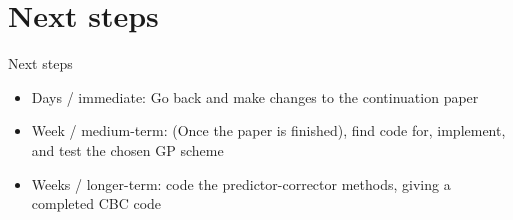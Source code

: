 \documentclass[presentation]{beamer}
\begin{document}
\section{Next steps}
\label{sec:org30039c0}
\begin{frame}[label={sec:org4ccfa47}]{Next steps}
\begin{itemize}
\item Days / immediate: Go back and make changes to the continuation paper
\item Week  / medium-term: (Once the paper is finished), find code for, implement, and test the chosen GP scheme
\item Weeks / longer-term: code the predictor-corrector methods, giving a completed CBC code
\end{itemize}
\end{frame}
\end{document}
